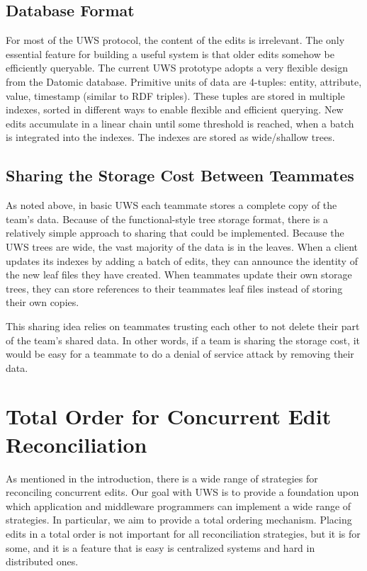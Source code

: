 \documentclass[runningheads]{llncs}
\begin{document}
\subsection{Database Format}

For most of the UWS protocol, the content of the edits is irrelevant.
The only essential feature for building a useful system is that older edits somehow be efficiently queryable.
The current UWS prototype adopts a very flexible design from the Datomic database.
Primitive units of data are 4-tuples: entity, attribute, value, timestamp (similar to RDF triples).
These tuples are stored in multiple indexes, sorted in different ways to enable flexible and efficient querying.
New edits accumulate in a linear chain until some threshold is reached, when a batch is integrated into the indexes.
The indexes are stored as wide{\slash}shallow trees.

\subsection{Sharing the Storage Cost Between Teammates}

As noted above, in basic UWS each teammate stores a complete copy of the team's data.
Because of the functional-style tree storage format, there is a relatively simple approach to sharing that could be implemented.
Because the UWS trees are wide, the vast majority of the data is in the leaves.
When a client updates its indexes by adding a batch of edits, they can announce the identity of the new leaf files they have created.
When teammates update their own storage trees, they can store references to their teammates leaf files instead of storing their own copies.

This sharing idea relies on teammates trusting each other to not delete their part of the team's shared data.
In other words, if a team is sharing the storage cost, it would be easy for a teammate to do a denial of service attack by removing their data.

\section{Total Order for Concurrent Edit Reconciliation}

As mentioned in the introduction, there is a wide range of strategies for reconciling concurrent edits.
Our goal with UWS is to provide a foundation upon which application and middleware programmers can implement a wide range of strategies.
In particular, we aim to provide a total ordering mechanism.
Placing edits in a total order is not important for all reconciliation strategies, but it is for some, and it is a feature that is easy is centralized systems and hard in distributed ones.
\end{document}
